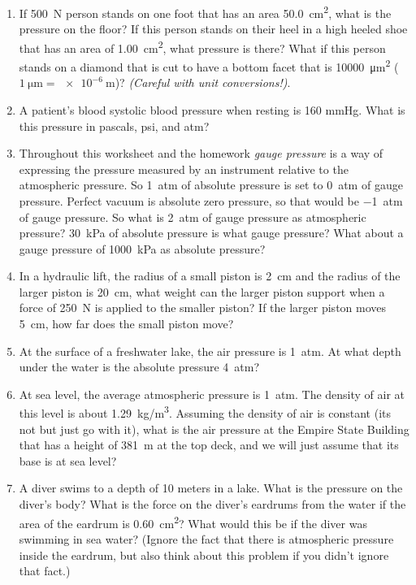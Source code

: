 \begin{enumerate}
	\setlength\itemsep{2 in}
	
	\item If \SI{500}{N} person stands on one foot that has an area \SI{50.0}{cm^2}, what is the pressure on the floor? If this person stands on their heel in a high heeled shoe that has an area of \SI{1.00}{cm^2}, what pressure is there? What if this person stands on a diamond that is cut to have a bottom facet that is \SI{10000}{\micro\meter^2} ($\SI{1}{\micro\meter}=\SI{e-6}{\meter}$)? \emph{(Careful with unit conversions!)}.
	
	\item
	A patient's blood systolic blood pressure when resting is 160 mmHg. What is this pressure in pascals, psi, and atm?
	
	\item
	Throughout this worksheet and the homework \emph{gauge pressure} is a way of expressing the pressure measured by an instrument relative to the atmospheric pressure. So \SI{1}{atm} of absolute pressure is set to \SI{0}{atm} of gauge pressure. Perfect vacuum is absolute zero pressure, so that would be \SI{-1}{atm} of gauge pressure. So what is \SI{2}{atm} of gauge pressure as atmospheric pressure? \SI{30}{\kilo\pascal} of absolute pressure is what gauge pressure? What about a gauge pressure of \SI{1000}{\kilo\pascal} as absolute pressure?
	
	\item
	In a hydraulic lift, the radius of a small piston is \SI{2}{cm} and the radius of the larger piston is \SI{20}{cm}, what weight can the larger piston support when a force of \SI{250}{N} is applied to the smaller piston? If the larger piston moves \SI{5}{cm}, how far does the small piston move?\bigskip
	
	\item
	At the surface of a freshwater lake, the air pressure is \SI{1}{atm}. At what depth under the water is the absolute pressure \SI{4}{atm}? \bigskip
	
	\item 
	At sea level, the average atmospheric pressure is \SI{1}{atm}. The density of air at this level is about \SI{1.29}{kg/m^3}. Assuming the density of air is constant (its not but just go with it), what is the air pressure at the Empire State Building that has a height of \SI{381}{\meter} at the top deck, and we will just assume that its base is at sea level?
	
	\item 
	A diver swims to a depth of 10 meters in a lake. What is the pressure on the diver's body? What is the force on the diver's eardrums from the water if the area of the eardrum is \SI{0.60}{cm^2}? What would this be if the diver was swimming in sea water? (Ignore the fact that there is atmospheric pressure inside the eardrum, but also think about this problem if you didn't ignore that fact.)
	

\end{enumerate}
